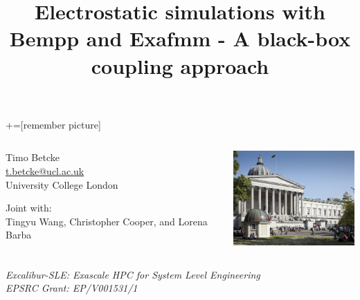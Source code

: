 \documentclass[dvipsnames,10pt]{beamer}
\title{Electrostatic simulations with Bempp and Exafmm - A black-box coupling approach}
\date{}
\begin{document}
\lstset{language=Python}
+=[remember picture]
\begin{frame}

\vspace{1cm}

\titlepage
\vspace{-2cm}
\begin{columns}[T]
\begin{column}{.48\textwidth}
\begin{center}
    Timo Betcke \\
    \url{t.betcke@ucl.ac.uk}\\
    University College London
\end{center}
\begin{tcolorbox}
Joint with:\\ Tingyu Wang, Christopher Cooper, and Lorena Barba
\end{tcolorbox}
\end{column}%
\hfill%
\begin{column}{.48\textwidth}
\includegraphics[width=5cm]{../figs/ucl_campus}

\end{column}%
\end{columns}
\textit{Excalibur-SLE: Exascale HPC for System Level Engineering\\
EPSRC Grant: EP/V001531/1}

\end{frame}
\end{document}
